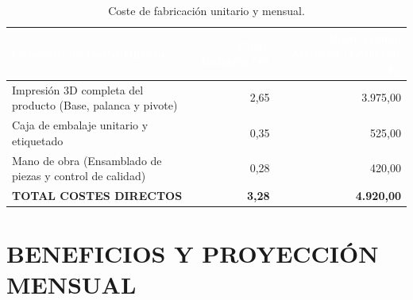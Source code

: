 \documentclass[11pt,a4paper]{article}
\begin{document}
\begin{table}[H]
\centering
\renewcommand{\arraystretch}{1.3}
\begin{tabularx}{\textwidth}{|X|r|r|}
\hline
\rowcolor{ArthroTeal}
\textcolor{white}{\textbf{Concepto de Gasto Directo}} & \textcolor{white}{\textbf{Coste Unitario (€)}} & \textcolor{white}{\textbf{Coste Global Mensual (1.500 ud) (€)}} \\
\hline
Impresión 3D completa del producto (Base, palanca y pivote) & 2,65 & 3.975,00 \\
\hline
Caja de embalaje unitario y etiquetado & 0,35 & 525,00 \\
\hline
Mano de obra (Ensamblado de piezas y control de calidad) & 0,28 & 420,00 \\
\hline
\rowcolor{ArthroNavy!10}
\textbf{TOTAL COSTES DIRECTOS} & \textbf{3,28} & \textbf{4.920,00} \\
\hline
\end{tabularx}
\caption{Coste de fabricación unitario y mensual.}
\label{tab:coste-fabricacion}
\end{table}
\vspace{2 cm}

\section{BENEFICIOS Y PROYECCIÓN MENSUAL}
\end{document}
